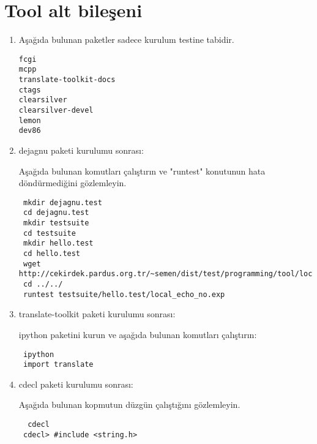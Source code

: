 \documentclass[a4paper,10pt]{article}
\begin{document}
\section{Tool alt bileşeni}
\begin{enumerate}
 \item Aşağıda bulunan paketler sadece kurulum testine tabidir.
\begin{verbatim}
fcgi
mcpp
translate-toolkit-docs
ctags
clearsilver
clearsilver-devel
lemon
dev86
\end{verbatim}
\item dejagnu paketi kurulumu sonrası:


Aşağıda bulunan komutları çalıştırın ve "runtest" konutunun hata döndürmediğini gözlemleyin.
\begin{verbatim}
 mkdir dejagnu.test
 cd dejagnu.test
 mkdir testsuite
 cd testsuite
 mkdir hello.test
 cd hello.test
 wget http://cekirdek.pardus.org.tr/~semen/dist/test/programming/tool/local_echo_no.exp
 cd ../../
 runtest testsuite/hello.test/local_echo_no.exp
\end{verbatim}

\item translate-toolkit paketi kurulumu sonrası:

ipython paketini kurun ve aşağıda bulunan komutları çalıştırın:
\begin{verbatim}
 ipython
 import translate
\end{verbatim}

\item cdecl paketi kurulumu sonrası:

Aşağıda bulunan kopmutun düzgün çalıştığını gözlemleyin.
\begin{verbatim}
  cdecl
 cdecl> #include <string.h>
\end{verbatim}

\end{enumerate}
\end{document}
